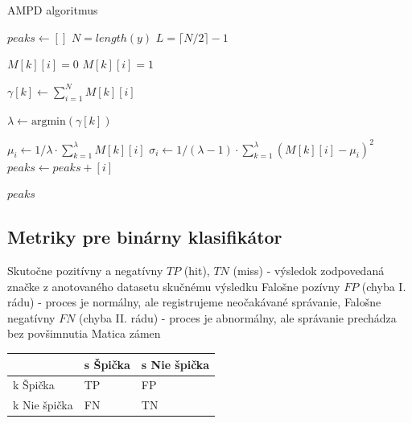 \begin{algorithm}
\caption{AMPD algoritmus}
\begin{algorithmic}[1]
	\State $peaks \gets []$
	\State $N = length(y)$	
	\State $L = \lceil N / 2 \rceil - 1$
	
	  
				\State $M[k][i] = 0$
			\Else
				\State $M[k][i] = 1$
			\EndIf
		\EndFor
	\EndFor

	  
		\State $\gamma[k] \gets \sum_{i = 1}^{N}{M[k][i]}$
	\EndFor	
	
	\State $\lambda \gets \mathrm{argmin}(\gamma[k])$ 
	
		\State $\mu_i \gets 1/\lambda \cdot \sum_{k = 1}^{\lambda}{M[k][i]}$  
		\State $\sigma_i \gets 1 / (\lambda - 1) \cdot \sum_{k = 1}^{\lambda}(M[k][i] - \mu_i)^2$
			\State $peaks \gets peaks + [i]$
		\EndIf
	\EndFor
	
	\State \Return $peaks$
\EndFunction
\end{algorithmic}
\end{algorithm}

\subsection{Metriky pre binárny klasifikátor}
Skutočne pozitívny a negatívny $TP$ (hit), $TN$ (miss) - výsledok zodpovedaná značke z anotovaného datasetu skučnému výsledku
Falošne pozívny $FP$ (chyba I. rádu) - proces je normálny, ale registrujeme neočakávané správanie,
Falošne negatívny $FN$ (chyba II. rádu) - proces je abnormálny, ale správanie prechádza bez povšimnutia
Matica zámen 
\begin{table}[]
\begin{tabular}{|l|l|l|}
\hline
             & s Špička & s Nie špička \\ \hline
k Špička     & TP       & FP           \\ \hline
k Nie špička & FN       & TN           \\ \hline
\end{tabular}
\end{table}

